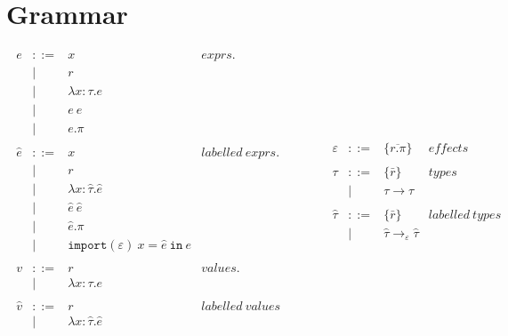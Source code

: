 \documentclass{llncs}
\newcommand{\keywadj}[1]{\mathtt{#1}}
\newcommand{\kwa}[1]{\keywadj{ #1 }}
\begin{document}
\section{Grammar}

\[
\begin{array}{lll}

\begin{array}{lllr}

e & ::= & x & exprs. \\
	& | & r \\
	& | & \lambda x: \tau.e \\
	& | & e ~ e \\
	& | & e.\pi \\
	&&\\

\hat e & ::= & x & labelled~exprs. \\
	& | & r \\
	& | & \lambda x: \hat \tau.\hat e \\
	& | & \hat e ~ \hat e \\
	& | & \hat e.\pi \\
	& | & \kwa{import}(\varepsilon)~x = \hat e~\kwa{in}~e \\
	&&\\

v & ::= & r & values. \\
	& | & \lambda x: \tau.e \\
	&&\\
	
\hat v & ::= & r & labelled~values \\
	& | & \lambda x: \hat \tau.\hat e\\
	&&\\

\end{array}

& ~~~~~~~~&

\begin{array}{lllr}

\varepsilon & ::= & \{ \overline{r.\pi} \} & effects \\
	&&\\

\tau & ::= & \{ \bar r \} & types \\
		& | & \tau \rightarrow \tau \\ 
		&&\\

\hat \tau & ::= & \{ \bar r \} & labelled ~types \\
		& | & \hat \tau \rightarrow_{\varepsilon} \hat \tau \\
		&&\\


\end{array}
\end{array}\]
\end{document}
